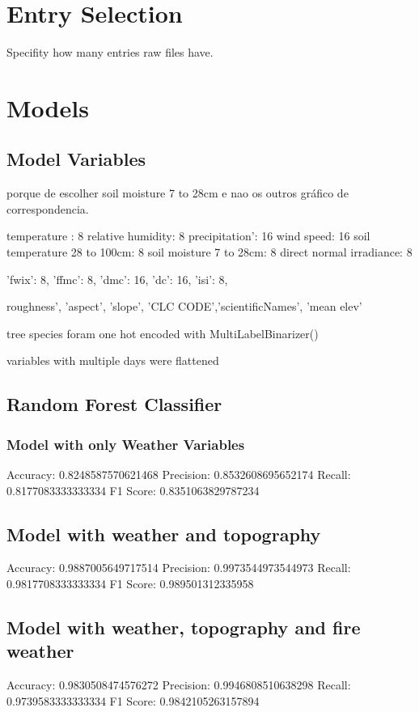 \section{Entry Selection}
Specifity how many entries raw files have.







\section{Models}

\subsection{Model Variables}

porque de escolher soil moisture 7 to 28cm e nao os outros gráfico de correspondencia.

temperature : 8
relative humidity: 8
precipitation': 16
wind speed: 16
soil temperature 28 to 100cm: 8
soil moisture 7 to 28cm: 8
direct normal irradiance: 8

'fwix': 8,
'ffmc': 8,
'dmc': 16,
'dc': 16,
'isi': 8,

roughness', 'aspect', 'slope', 'CLC CODE','scientificNames', 'mean elev'

tree species foram one hot encoded with MultiLabelBinarizer()

variables with multiple days were flattened

\subsection{Random Forest Classifier}



\subsubsection{Model with only Weather Variables}

Accuracy: 0.8248587570621468
Precision: 0.8532608695652174
Recall: 0.8177083333333334
F1 Score: 0.8351063829787234


\subsection{Model with weather and topography}

Accuracy: 0.9887005649717514
Precision: 0.9973544973544973
Recall: 0.9817708333333334
F1 Score: 0.989501312335958

\subsection{Model with weather, topography and fire weather}

Accuracy: 0.9830508474576272
Precision: 0.9946808510638298
Recall: 0.9739583333333334
F1 Score: 0.9842105263157894






